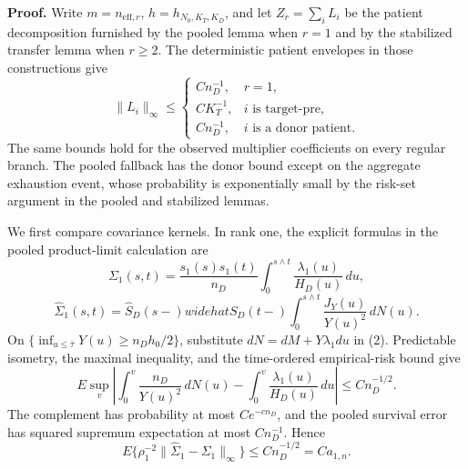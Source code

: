 \textbf{Proof.}
Write \(m=n_{\mathrm{eff},r}\), \(h=h_{N_0,K_T,K_D}\), and let \(Z_r=\sum_iL_i\) be the patient decomposition furnished by the pooled lemma when \(r=1\) and by the stabilized transfer lemma when \(r\ge2\). The deterministic patient envelopes in those constructions give
\[
 \|L_i\|_\infty\le
 \begin{cases}
 Cn_D^{-1},&r=1,\\
 CK_T^{-1},&i\text{ is target-pre},\\
 Cn_D^{-1},&i\text{ is a donor patient}.
 \end{cases}                                                   \tag{1}
\]
The same bounds hold for the observed multiplier coefficients on every regular branch. The pooled fallback has the donor bound except on the aggregate exhaustion event, whose probability is exponentially small by the risk-set argument in the pooled and stabilized lemmas.

We first compare covariance kernels. In rank one, the explicit formulas in the pooled product-limit calculation are
\[
 \Sigma_1(s,t)=\frac{s_1(s)s_1(t)}{n_D}
 \int_0^{s\wedge t}\frac{\lambda_1(u)}{H_D(u)}\,du,
\]
\[
 \widehat\Sigma_1(s,t)=\widehat S_D(s-)widehat S_D(t-)
 \int_0^{s\wedge t}\frac{J_Y(u)}{Y(u)^2}\,dN(u).          \tag{2}
\]
On \(\{\inf_{u\le\bar\tau}Y(u)\ge n_Dh_0/2\}\), substitute \(dN=dM+Y\lambda_1du\) in (2). Predictable isometry, the maximal inequality, and the time-ordered empirical-risk bound give
\[
 E\sup_v\left|
 \int_0^v\frac{n_D}{Y(u)^2}\,dN(u)
 -\int_0^v\frac{\lambda_1(u)}{H_D(u)}\,du
 \right|\le Cn_D^{-1/2}.                                  \tag{3}
\]
The complement has probability at most \(Ce^{-cn_D}\), and the pooled survival error has squared supremum expectation at most \(Cn_D^{-1}\). Hence
\[
 E\{\rho_1^{-2}\|\widehat\Sigma_1-\Sigma_1\|_\infty\}
 \le Cn_D^{-1/2}=Ca_{1,n}.                                \tag{4}
\]

